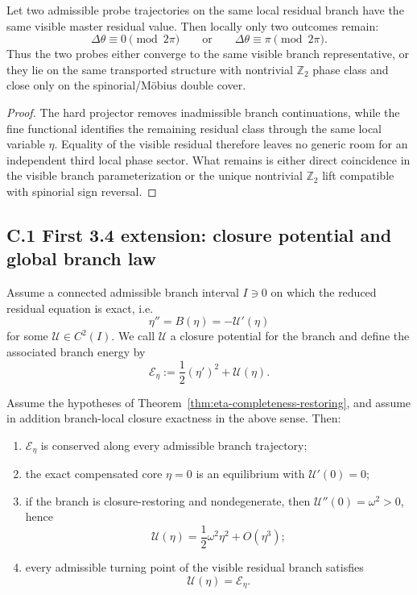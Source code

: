 \begin{proposition}
Let two admissible probe trajectories on the same local residual branch have the same visible master residual value. Then locally only two outcomes remain:
\[
  \Delta\theta\equiv 0 \pmod{2\pi}
  \qquad\text{or}\qquad
  \Delta\theta\equiv \pi \pmod{2\pi}.
\]
Thus the two probes either converge to the same visible branch representative, or they lie on the same transported structure with nontrivial $\mathbb Z_2$ phase class and close only on the spinorial/M\"obius double cover.
\end{proposition}

\begin{proof}
The hard projector removes inadmissible branch continuations, while the fine functional identifies the remaining residual class through the same local variable $\eta$. Equality of the visible residual therefore leaves no generic room for an independent third local phase sector. What remains is either direct coincidence in the visible branch parameterization or the unique nontrivial $\mathbb Z_2$ lift compatible with spinorial sign reversal.
\end{proof}

\subsection*{C.1 First 3.4 extension: closure potential and global branch law}

\begin{definition}
Assume a connected admissible branch interval $I\ni 0$ on which the reduced residual equation is exact, i.e.
\[
  \eta'' = B(\eta) = -\mathcal U'(\eta)
\]
for some $\mathcal U\in C^2(I)$. We call $\mathcal U$ a closure potential for the branch and define the associated branch energy by
\[
  \mathcal E_\eta := \frac12 (\eta')^2 + \mathcal U(\eta).
\]
\end{definition}

\begin{theorem}
\label{thm:global-exact-branch-law}
Assume the hypotheses of Theorem~\ref{thm:eta-completeness-restoring}, and assume in addition branch-local closure exactness in the above sense. Then:
\begin{enumerate}[label=(\roman*)]
  \item $\mathcal E_\eta$ is conserved along every admissible branch trajectory;
  \item the exact compensated core $\eta=0$ is an equilibrium with $\mathcal U'(0)=0$;
  \item if the branch is closure-restoring and nondegenerate, then $\mathcal U''(0)=\omega^2>0$, hence
  \[
    \mathcal U(\eta)=\frac12 \omega^2 \eta^2 + O(\eta^3);
  \]
  \item every admissible turning point of the visible residual branch satisfies
  \[
    \mathcal U(\eta)=\mathcal E_\eta.
  \]
\end{enumerate}
\end{theorem}

